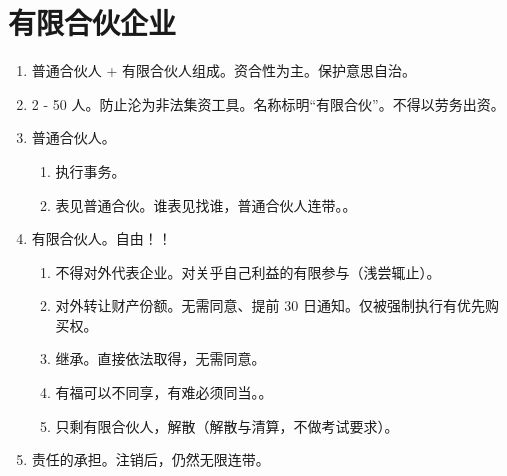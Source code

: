 \section{有限合伙企业}
\begin{enumerate}
  \item 普通合伙人 + 有限合伙人组成。资合性为主。保护意思自治。
  \item 2 - 50 人。防止沦为非法集资工具。名称标明“有限合伙”。不得以劳务出资。
  \item 普通合伙人。
        \begin{enumerate}
          \item 执行事务。
          \item 表见普通合伙。谁表见找谁，普通合伙人连带。。
        \end{enumerate}
  \item 有限合伙人。自由！！
        \begin{enumerate}
          \item 不得对外代表企业。对关乎自己利益的有限参与（浅尝辄止）。
          \item 对外转让财产份额。无需同意、提前 30 日通知。仅被强制执行有优先购买权。
          \item 继承。直接依法取得，无需同意。
          \item 有福可以不同享，有难必须同当。。
          \item 只剩有限合伙人，解散（解散与清算，不做考试要求）。
        \end{enumerate}
  \item 责任的承担。注销后，仍然无限连带。
\end{enumerate}
